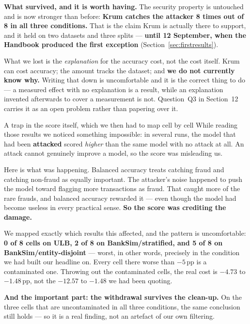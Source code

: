 \documentclass[11pt]{article}
\begin{document}
\textbf{What survived, and it is worth having.} The security property is untouched and is now stronger
than before: \textbf{Krum catches the attacker 8 times out of 8 in all three conditions.} That is the
claim Krum is actually there to support, and it held on two datasets and three splits --- \textbf{until
12 September, when the Handbook produced the first exception} (Section~\ref{sec:firstresults}).

What we lost is the \emph{explanation} for the accuracy cost, not the cost itself. Krum can cost
accuracy; the amount tracks the dataset; and \textbf{we do not currently know why.} Writing that down is
uncomfortable and it is the correct thing to do --- a measured effect with no explanation is a result,
while an explanation invented afterwards to cover a measurement is not. Question~Q3 in Section~12
carries it as an open problem rather than papering over it.

\begin{warnbox}{A trap in the score itself, which we then had to map cell by cell}
While reading those results we noticed something impossible: in several runs, the model that had been
\textbf{attacked} scored \emph{higher} than the same model with no attack at all. An attack cannot
genuinely improve a model, so the score was misleading us.

Here is what was happening. Balanced accuracy treats catching fraud and catching non-fraud as equally
important. The attacker's noise happened to push the model toward flagging more transactions as fraud.
That caught more of the rare frauds, and balanced accuracy rewarded it --- even though the model had
become useless in every practical sense. \textbf{So the score was crediting the damage.}

We mapped exactly which results this affected, and the pattern is uncomfortable: \textbf{0 of 8 cells on
ULB, 2 of 8 on BankSim/stratified, and 5 of 8 on BankSim/entity-disjoint} --- worst, in other words,
precisely in the condition we had built our headline on. Every cell there worse than $-5$\,pp is a
contaminated one. Throwing out the contaminated cells, the real cost is $-4.73$ to $-1.48$\,pp, not the
$-12.57$ to $-1.48$ we had been quoting.

\textbf{And the important part: the withdrawal survives the clean-up.} On the three cells that are
uncontaminated in all three conditions, the same conclusion still holds --- so it is a real finding, not
an artefact of our own filtering.
\end{warnbox}
\end{document}
